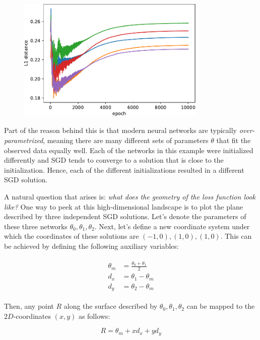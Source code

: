 \documentclass[12pt]{article}
\begin{document}
\begin{figure}[ht]
\centering
\includegraphics[width=9cm]{plots/1d_ens_param_distance.pdf}
\caption{}
\label{fig_1d_ens_param_distance}
\end{figure}

Part of the reason behind this is that modern neural networks are typically \textit{over-parametrized}, meaning there are many different sets of parameters $\theta$ that fit the observed data equally well. \cite{underspecification, deep_ens, mode_connectivity} Each of the networks in this example were initialized differently and SGD tends to converge to a solution that is close to the initialization. Hence, each of the different initializations resulted in a different SGD solution.

A natural question that arises is: \textit{what does the geometry of the loss function look like?} One way to peek at this high-dimensional landscape is to plot the plane described by three independent SGD solutions. Let's denote the parameters of these three networks $\theta_0, \theta_1, \theta_2$. Next, let's define a new coordinate system under which the coordinates of these solutions are $(-1, 0), (1, 0), (1, 0)$. This can be achieved by defining the following auxiliary variables:

\begin{align}
\begin{split}
\theta_m &= \frac{\theta_0 + \theta_1}{2} \\
d_x &= \theta_1 - \theta_m \\
d_y &= \theta_2 - \theta_m
\end{split}
\end{align}

Then, any point $R$ along the surface described by $\theta_0, \theta_1, \theta_2$ can be mapped to the $2D$-coordinates $(x, y)$ as follows:

\begin{equation}
R = \theta_m + x d_x + y d_y
\end{equation}
\end{document}
